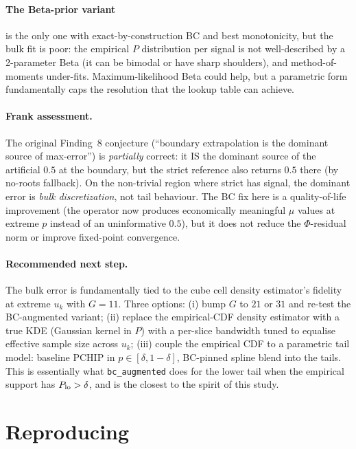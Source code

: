 \documentclass[11pt]{article}
\begin{document}
\paragraph{The Beta-prior variant} is the only one with exact-by-construction
BC and best monotonicity, but the bulk fit is poor: the empirical $P$
distribution per signal is not well-described by a 2-parameter Beta (it can
be bimodal or have sharp shoulders), and method-of-moments under-fits.
Maximum-likelihood Beta could help, but a parametric form fundamentally caps
the resolution that the lookup table can achieve.

\paragraph{Frank assessment.} The original Finding~8 conjecture
(``boundary extrapolation is the dominant source of max-error'') is
\emph{partially} correct: it IS the dominant source of the artificial
$0.5$ at the boundary, but the strict reference also returns $0.5$ there
(by no-roots fallback). On the non-trivial region where strict has signal,
the dominant error is \emph{bulk discretization}, not tail behaviour. The
BC fix here is a quality-of-life improvement (the operator now produces
economically meaningful $\mu$ values at extreme $p$ instead of an
uninformative $0.5$), but it does not reduce the $\Phi$-residual norm or
improve fixed-point convergence.

\paragraph{Recommended next step.}
The bulk error is fundamentally tied to the cube cell density estimator's
fidelity at extreme $u_k$ with $G=11$. Three options:
(i) bump $G$ to $21$ or $31$ and re-test the BC-augmented variant;
(ii) replace the empirical-CDF density estimator with a true KDE
     (Gaussian kernel in $P$) with a per-slice bandwidth tuned to
     equalise effective sample size across $u_k$;
(iii) couple the empirical CDF to a parametric tail model:
     baseline PCHIP in $p\in[\delta, 1-\delta]$, BC-pinned spline blend
     into the tails. This is essentially what \texttt{bc\_augmented} does
     for the lower tail when the empirical support has $P_{\rm lo}>\delta$,
     and is the closest to the spirit of this study.

\section{Reproducing}
\end{document}
